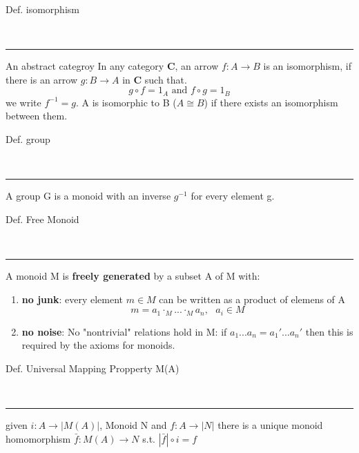 \begin{note}
  \begin{field}
    Def. isomorphism
  \end{field} \\
  \noindent\rule[0.5ex]{\linewidth}{1pt}
  \begin{field}
    An abstract categroy
    In any category \textbf{C}, an arrow $f: A\rightarrow B$ is an isomorphism, if there is an arrow $g: B\rightarrow A$ in \textbf{C} such that.
    \[ g\circ f = 1_A\text{ and }f\circ g = 1_B \]
    we write $f^{-1} = g$.
    A is isomorphic to B ($A\cong B$) if there exists an isomorphism between them.
  \end{field}
\end{note}

\begin{note}
  \begin{field}
    Def. group
  \end{field} \\
  \noindent\rule[0.5ex]{\linewidth}{1pt}
  \begin{field}
    A group G is a monoid with an inverse $g^{-1}$ for every element g.
  \end{field}
\end{note}

\begin{note}
  \begin{field}
    Def. Free Monoid
  \end{field} \\
  \noindent\rule[0.5ex]{\linewidth}{1pt}
  \begin{field}
    A monoid M is \textbf{freely generated} by a subset A of M with:
    \begin{enumerate}
      \item \textbf{no junk}: every element $m\in M$ can be written as a product of elemens of A\\
        \[ m = a_1 \cdot_M ... \cdot_M a_n,\ \ \ a_i\in M \]
      \item \textbf{no noise}: No "nontrivial" relations hold in M: if $a_1 ... a_n = a_1' ... a_n'$ then this is required by the axioms for monoids.
    \end{enumerate}
  \end{field}
\end{note}

\begin{note}
  \begin{field}
    Def. Universal Mapping Propperty M(A)
  \end{field} \\
  \noindent\rule[0.5ex]{\linewidth}{1pt}
  \begin{field}
    given $i: A \rightarrow |M(A)|$, Monoid N and $f: A \rightarrow |N|$ there is a unique monoid homomorphism $\bar f: M(A) \rightarrow N$ s.t. $|\bar f|\circ i = f$
  \end{field}
\end{note}

